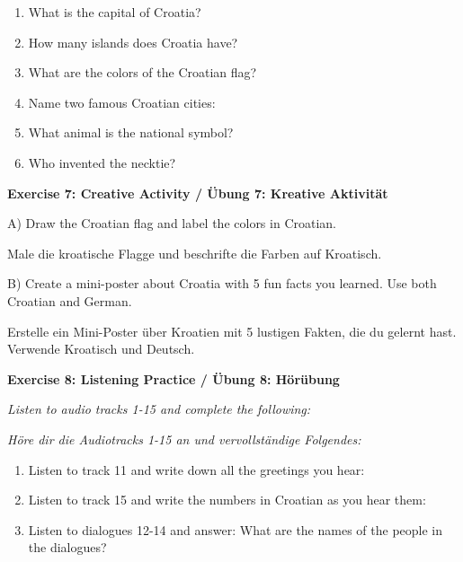 \begin{exercise}
\begin{enumerate}
    \item What is the capital of Croatia? \underline{\hspace{6cm}}
    \item How many islands does Croatia have? \underline{\hspace{6cm}}
    \item What are the colors of the Croatian flag? \underline{\hspace{6cm}}
    \item Name two famous Croatian cities: \underline{\hspace{6cm}}
    \item What animal is the national symbol? \underline{\hspace{6cm}}
    \item Who invented the necktie? \underline{\hspace{6cm}}
\end{enumerate}

\vspace{2cm}

\textbf{Exercise 7: Creative Activity / Übung 7: Kreative Aktivität}

A) Draw the Croatian flag and label the colors in Croatian.

Male die kroatische Flagge und beschrifte die Farben auf Kroatisch.

\vspace{5cm}

B) Create a mini-poster about Croatia with 5 fun facts you learned. Use both Croatian and German.

Erstelle ein Mini-Poster über Kroatien mit 5 lustigen Fakten, die du gelernt hast. Verwende Kroatisch und Deutsch.

\vspace{5cm}

\textbf{Exercise 8: Listening Practice / Übung 8: Hörübung}

\textit{Listen to audio tracks 1-15 and complete the following:}

\textit{Höre dir die Audiotracks 1-15 an und vervollständige Folgendes:}

\begin{enumerate}
    \item Listen to track 11 and write down all the greetings you hear:
    
    \vspace{2cm}
    
    \item Listen to track 15 and write the numbers in Croatian as you hear them:
    
    \vspace{2cm}
    
    \item Listen to dialogues 12-14 and answer: What are the names of the people in the dialogues?
    
    \vspace{2cm}
\end{enumerate}
\end{exercise}

